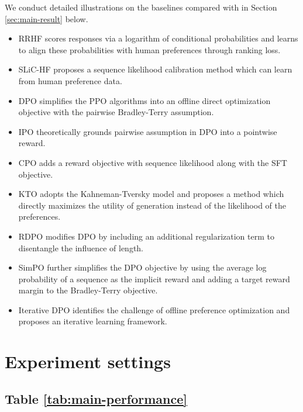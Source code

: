 We conduct detailed illustrations on the baselines compared with \Ours in Section \ref{sec:main-result} below.

\begin{itemize}[leftmargin=*]
  \item RRHF \citep{yuan2023rrhf} scores responses via a logarithm of conditional probabilities and learns to align these probabilities with human preferences through ranking loss.
  \item SLiC-HF \citep{zhao2023slic} proposes a sequence likelihood calibration method which can learn from human preference data.
  \item DPO \citep{guo2024direct} simplifies the PPO \citep{ouyang2022training} algorithms into an offline direct optimization objective with the pairwise Bradley-Terry assumption.
  \item IPO \citep{azar2024general} theoretically grounds pairwise assumption in DPO into a pointwise reward.
  \item CPO \citep{xu2024contrastive} adds a reward objective with sequence likelihood along with the SFT objective.
  \item KTO \citep{ethayarajh2024kto} adopts the Kahneman-Tversky model and proposes a method which directly maximizes the utility of generation instead of the likelihood of the preferences.
  \item RDPO \citep{park2024disentangling} modifies DPO by including an additional regularization term to disentangle the influence of length.
  \item SimPO \citep{meng2024simpo} further simplifies the DPO objective by using the average log probability of a sequence as the implicit reward and adding a target reward margin to the Bradley-Terry objective.
  \item Iterative DPO \citep{xiong2024iterative} identifies the challenge of offline preference optimization and proposes an iterative learning framework.
\end{itemize}


\section{Experiment settings}\label{apx:sec:main-result-setting}

\subsection{Table \ref{tab:main-performance}}\label{apx:sec:main}

